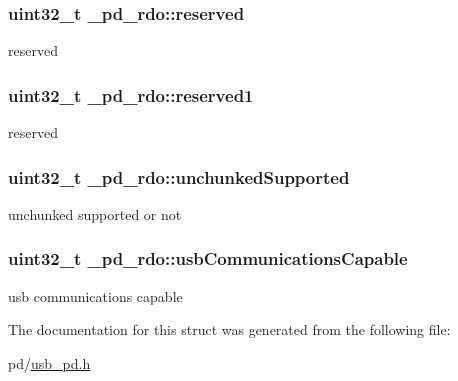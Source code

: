 \hypertarget{struct__pd__rdo_ad10d5e670fae5dd17c3ec06a8e994ea7}{
\subsubsection[{reserved}]{\setlength{\rightskip}{0pt plus 5cm}uint32\-\_\-t \-\_\-pd\-\_\-rdo\-::reserved}}\label{struct__pd__rdo_ad10d5e670fae5dd17c3ec06a8e994ea7}
reserved \hypertarget{struct__pd__rdo_ac02715c88773bd4b67ab4a24aa98a481}{
\subsubsection[{reserved1}]{\setlength{\rightskip}{0pt plus 5cm}uint32\-\_\-t \-\_\-pd\-\_\-rdo\-::reserved1}}\label{struct__pd__rdo_ac02715c88773bd4b67ab4a24aa98a481}
reserved \hypertarget{struct__pd__rdo_ab37db01bb9fe1af93aacc97242516364}{
\subsubsection[{unchunked\-Supported}]{\setlength{\rightskip}{0pt plus 5cm}uint32\-\_\-t \-\_\-pd\-\_\-rdo\-::unchunked\-Supported}}\label{struct__pd__rdo_ab37db01bb9fe1af93aacc97242516364}
unchunked supported or not \hypertarget{struct__pd__rdo_a3276a3edcd2e5ee3e9f17d9cca8f3ea2}{
\subsubsection[{usb\-Communications\-Capable}]{\setlength{\rightskip}{0pt plus 5cm}uint32\-\_\-t \-\_\-pd\-\_\-rdo\-::usb\-Communications\-Capable}}\label{struct__pd__rdo_a3276a3edcd2e5ee3e9f17d9cca8f3ea2}
usb communications capable 

The documentation for this struct was generated from the following file\-:\begin{DoxyCompactItemize}
\item 
pd/\hyperlink{usb__pd_8h}{usb\-\_\-pd.\-h}\end{DoxyCompactItemize}
